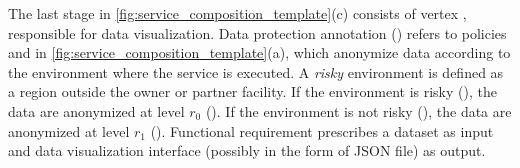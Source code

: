 \begin{example}[\bf \pipelineTemplate]
  The last stage in \cref{fig:service_composition_template}(c) consists of vertex , responsible for data visualization.
  Data protection annotation \myLambda() refers to policies  and  in \cref{fig:service_composition_template}(a), which anonymize data according to the environment where the service is executed.
  A \emph{risky} environment is defined as a region outside the owner or partner facility.
  If the environment is risky (), the data are anonymized at level $r_0$ ().
  If the environment is not risky (), the data are anonymized at level $r_1$ ().
  Functional requirement  prescribes a dataset as input and data visualization interface (possibly in the form of JSON file) as output.
\end{example}